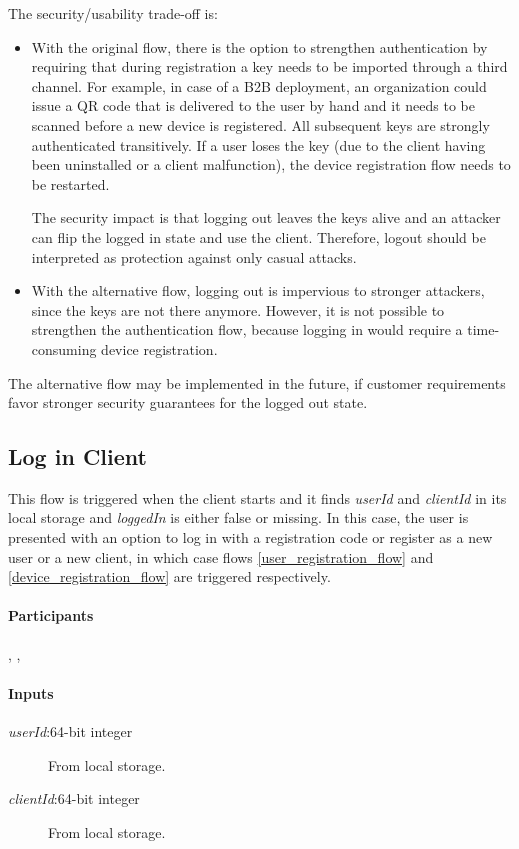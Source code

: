 \documentclass[a4paper,10pt,draft]{article}
\newcommand{\userId}{\emph{userId}}
\newcommand{\clientId}{\emph{clientId}}
\newcommand{\loggedIn}{\emph{loggedIn}}
\begin{document}
The security/usability trade-off is:

\begin{itemize}
 \item With the original flow, there is the option to strengthen authentication by requiring that during registration a key needs to be imported through a third channel. For 
example, in case of a B2B deployment, an organization could issue a QR code that is delivered to the user by hand and it needs to be scanned before a new device is registered. All 
subsequent keys are strongly authenticated transitively. If a user loses the key (due to the client having been uninstalled or a client malfunction), the device registration flow 
needs to be restarted.

The security impact is that logging out leaves the keys alive and an attacker can flip the logged in state and use the client. Therefore, logout should be interpreted as 
protection against only casual attacks.
\item With the alternative flow, logging out is impervious to stronger attackers, since the keys are not there anymore. However, it is not possible to strengthen the 
authentication flow, because logging in would require a time-consuming device registration.
\end{itemize}

The alternative flow may be implemented in the future, if customer requirements favor stronger security guarantees for the logged out state.

\subsection{Log in Client}
\label{log_in_client_flow}
This flow is triggered when the client starts and it finds \userId{} and \clientId{} in its local storage and \loggedIn{} is either false or missing. In this case, the user is 
presented with an option to log in with a registration code or register as a new user or a new client, in which case flows \ref{user_registration_flow} and 
\ref{device_registration_flow} are triggered respectively.

\paragraph{Participants} \Client{}, \Server{}, \User{}

\paragraph{Inputs}
\SpecialItem
\begin{description}
 \item[\userId{}:64-bit integer] From \Client{} local storage.
 \item[\clientId{}:64-bit integer] From \Client{} local storage.
\end{description}
\end{document}
